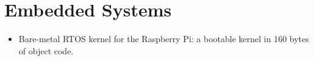 \section*{Embedded Systems}
\vspace{-2mm}

\begin{itemize}
    \item Bare-metal RTOS kernel for the Raspberry Pi: a bootable kernel
        in 160 bytes of object code.
\end{itemize}

